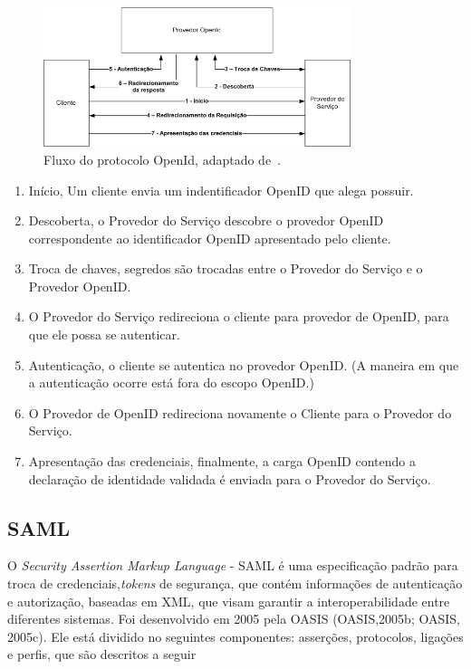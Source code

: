 \begin{figure}[!htb]
\centering
\includegraphics[width=0.8\textwidth]{openiddiagram.png}
\caption{Fluxo do protocolo OpenId, adaptado de~\cite{rfc6749}.}
\label{fig:openid}
\end{figure}

\begin{enumerate}[1 )]
\item  Início, Um cliente envia um indentificador OpenID que alega possuir.

\item  Descoberta, o Provedor do Serviço descobre o provedor OpenID correspondente ao identificador OpenID apresentado pelo cliente.

\item Troca de chaves,  segredos são trocadas entre o Provedor do Serviço e o Provedor OpenID.

\item O Provedor do Serviço redireciona o cliente para provedor de OpenID, para que ele possa se autenticar.

\item Autenticação, o cliente se autentica no provedor OpenID. (A maneira em que a autenticação ocorre está fora do escopo OpenID.)

\item O Provedor de OpenID redireciona novamente o Cliente para o Provedor do Serviço.

\item Apresentação das credenciais, finalmente, a carga OpenID contendo a declaração de identidade validada é enviada para o Provedor do Serviço.

\end{enumerate}

\subsection{SAML}

O \emph{Security Assertion Markup Language} - SAML é uma especificação padrão para troca de credenciais,\emph{tokens} de segurança, que contém informações de autenticação e autorização, baseadas em XML, que visam garantir a interoperabilidade entre diferentes sistemas. Foi desenvolvido em 2005 pela OASIS (OASIS,2005b; OASIS, 2005c). Ele está dividido no seguintes componentes: asserções, protocolos, ligações e perfis, que são descritos a seguir~\cite{Madsen2005}

